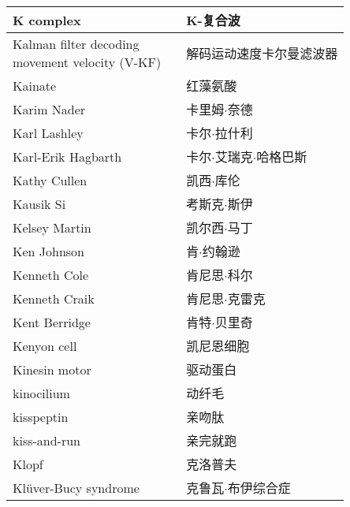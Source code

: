 \begin{longtable}{lll}
	\midrule
	K complex   && K-复合波  \\
	
	\midrule
	\makecell[l]{Kalman filter decoding \\movement velocity (V-KF)}   && 解码运动速度卡尔曼滤波器  \\
	
	\midrule
	Kainate   && 红藻氨酸  \\
	
	\midrule
	Karim Nader   && 卡里姆$\cdot$奈德  \\
	
	\midrule
	Karl Lashley  && 卡尔$\cdot$拉什利  \\
	
	\midrule
	Karl-Erik Hagbarth  && 卡尔$\cdot$艾瑞克$\cdot$哈格巴斯  \\
	
	\midrule
	Kathy Cullen  && 凯西$\cdot$库伦  \\
	
	\midrule
	Kausik Si  && 考斯克$\cdot$斯伊  \\
	
	\midrule
	Kelsey Martin   && 凯尔西$\cdot$马丁  \\
	
	\midrule
	Ken Johnson   && 肯$\cdot$约翰逊  \\
	
	\midrule
	Kenneth Cole   && 肯尼思$\cdot$科尔  \\
	
	\midrule
	Kenneth Craik   && 肯尼思$\cdot$克雷克  \\
	
	\midrule
	Kent Berridge   && 肯特$\cdot$贝里奇  \\
	
	\midrule
	Kenyon cell   && 凯尼恩细胞  \\
	
	\midrule
	Kinesin motor   && 驱动蛋白  \\
	
	\midrule
	kinocilium   && 动纤毛  \\
	
	\midrule
	kisspeptin   && 亲吻肽  \\
	
	\midrule
	kiss-and-run   && 亲完就跑  \\
	
	\midrule
	Klopf   && 克洛普夫  \\
	
	\midrule
	Klüver-Bucy syndrome   && 克鲁瓦$\cdot$布伊综合症  \\
	

\end{longtable}
